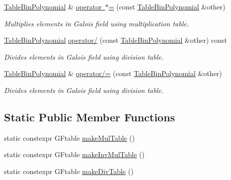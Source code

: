 \begin{DoxyCompactItemize}
\mbox{\label{class_g_flinalg_1_1_table_bin_polynomial_af7dacc30a8e3f4d89373a030f669588d}} 
\mbox{\hyperlink{class_g_flinalg_1_1_table_bin_polynomial}{Table\+Bin\+Polynomial}} \& \mbox{\hyperlink{class_g_flinalg_1_1_table_bin_polynomial_af7dacc30a8e3f4d89373a030f669588d}{operator $\ast$=}} (const \mbox{\hyperlink{class_g_flinalg_1_1_table_bin_polynomial}{Table\+Bin\+Polynomial}} \&other)
\begin{DoxyCompactList}\small\item\em Multiplies elements in Galois field using multiplication table. \end{DoxyCompactList}\item 
\mbox{\label{class_g_flinalg_1_1_table_bin_polynomial_a3ff07ee1f98da9d9a21606a7ab91c970}} 
\mbox{\hyperlink{class_g_flinalg_1_1_table_bin_polynomial}{Table\+Bin\+Polynomial}} \mbox{\hyperlink{class_g_flinalg_1_1_table_bin_polynomial_a3ff07ee1f98da9d9a21606a7ab91c970}{operator/}} (const \mbox{\hyperlink{class_g_flinalg_1_1_table_bin_polynomial}{Table\+Bin\+Polynomial}} \&other) const
\begin{DoxyCompactList}\small\item\em Divides elements in Galois field using division table. \end{DoxyCompactList}\item 
\mbox{\label{class_g_flinalg_1_1_table_bin_polynomial_af25794015128b3f9505b5ddd4539beb1}} 
\mbox{\hyperlink{class_g_flinalg_1_1_table_bin_polynomial}{Table\+Bin\+Polynomial}} \& \mbox{\hyperlink{class_g_flinalg_1_1_table_bin_polynomial_af25794015128b3f9505b5ddd4539beb1}{operator/=}} (const \mbox{\hyperlink{class_g_flinalg_1_1_table_bin_polynomial}{Table\+Bin\+Polynomial}} \&other)
\begin{DoxyCompactList}\small\item\em Divides elements in Galois field using division table. \end{DoxyCompactList}\end{DoxyCompactItemize}
\subsection*{Static Public Member Functions}
\begin{DoxyCompactItemize}
\item 
static constexpr G\+Ftable \mbox{\hyperlink{class_g_flinalg_1_1_table_bin_polynomial_aad37419226d193f007877e3bc33fbc2d}{make\+Mul\+Table}} ()
\item 
static constexpr G\+Ftable \mbox{\hyperlink{class_g_flinalg_1_1_table_bin_polynomial_a2a0dbcfb00f001ecb8075dc5848e019d}{make\+Inv\+Mul\+Table}} ()
\item 
static constexpr G\+Ftable \mbox{\hyperlink{class_g_flinalg_1_1_table_bin_polynomial_a96e01a69fa438eb178e50cccba002787}{make\+Div\+Table}} ()
\end{DoxyCompactItemize}
